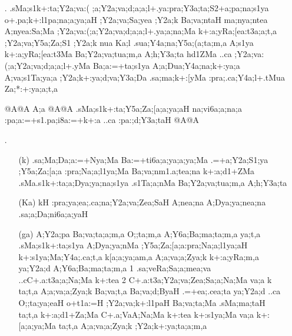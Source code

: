 \begin{spacing}{1.15}
\begin{itemize}
\begin{itemize}
    \end{itemize}
 
 \item[{\sktf 9}.] {\sktf .sMa;s1k+:ta\ZF{-};Y2a;va:(%
;a;Y2a;va;d;a;a;l+.ya\ZF{-}:pra;Y3a;ta;S2+a;pa;na;s1ya
o+.pa;k+:l1pa;na;a;ya;aH ;Y2a;va;Sa;yea ;Y2a;k
Ba;va;ntaH ma;nya;ntea  A{;nyea}:Sa;Ma {;Y2a;va}:(;a;Y2a;va;d;a;a;l+.ya;a;na;Ma
k+:a;yRa;[ea:t3a;a;t,a ;Y2a;va;Y5a;Za;S1 ;Y2a;k nua
Ka;l .sua;Y4a;na;Y5a;(a;ta;m,a A;s1ya k+:a;yRa;[ea:t3Ma
Ba;Y2a;va;tua;m,a A;h;Y3a;ta  {h}d1}{\sktf ZMa} {\sktf ..ca ;Y2a;va:(;a;Y2a;va;d;a;a;l+.yMa
Ba;a:=+ta;s1ya A;a;Dua;Y4a;na;k+:ya;a A;va;s1Ta;ya;a ;Y2a;k+:ya;d;va;Y3a;Da
.sa;ma;k+:[yMa :pra;.ca;Y4a;l+.tMua Za;*:+:ya;a;t,a } 
   
 {\sktb {}@A@A A;a @A@A .sMa;s1k+:ta;Y5a;Za;[a;a;ya;aH na;vi6a;a;na;a
:pa;a:=+s1.pa;i8a:=+k+:a ..ca :pa:;d;Y3a;taH%
 @A@A}


\item[{\sktf 10 }.] \begin{itemize}
   \item[({\sktf k})] {\sktf .sa;Ma;Da;a:=+Nya;Ma Ba:=+ti6a;a;ya;a;ya;Ma
.=+a;Y2a;S1;ya ;Y5a;Za;[a;a :pra;Na;a;l1ya;Ma
Ba;va;nm1.a;tea;na k+:a;d1+ZMa {.sMa}.s1k+:ta;a;Dya;ya;na;s1ya .s1Ta;a;nMa Ba;Y2a;va;tua;m,a
A;h;Y3a;ta }
            
   \item[({\sktf Ka})] {\sktf kH :pra;ya;ea;.ca;na;Y2a;va;Zea;SaH%
 A;nea;na A;Dya;ya;nea;na .sa;a;Da;ni6a;a;yaH }
            
    \item[({\sktf ga})] {\sktf A;Y2a;pa Ba;va;ta;a;m,a O;;ta;m,a
A;Y6a;Ba;ma;ta;m,a\ZF{,} ya;t,a .sMa;s1k+:ta;s1ya
A;Dya;ya;nMa ;Y5a;Za;[a;a\ZF{-}:pra;Na;a;l1ya;aH
k{+:s1ya;Ma};Y4a;.ca{;t,a} k{}[a;a{;ya;a}{m,a} A;a;va;a;Zya;k k+:a;yRa;m,a
 ya;Y2a;d A;Y6a;Ba;ma;ta;m,a\ZF{,} \ZF{(}1\ZF{)} .sa;veRa;Sa;a;mea;va
..cC+.a:t3a;a;Na;Ma k+:tea\ZF{,} \ZF{(}2\ZF{)}
C+.a:t3a;Y2a;va;Zea;Sa;a;Na;Ma va;a k\ZF{,} ta;t,a A;a;va;a;Zya;k Ba;va;t,a\ZF{,}
Ba;va;d;ByaH .=+ea;.cea;ta  ya;Y2a;d ..ca O;;ta;ya;eaH
o+t1a:=H ;Y2a;va;k+:l1paH Ba;va;ta;Ma
.sMa;ma;taH\ZF{,} ta;t,a k+:a;d1+Za;Ma C+.a;VaA;Na;Ma k+:tea\ZF{,} k+:s1ya;Ma va;a k+:[a;a;ya;Ma\ZF{,}
ta;t,a A;a;va;a;Zya;k ;Y2a;k+:ya;ta;a;m,a
} 
            

\end{itemize}
\end{itemize}
\end{spacing}
